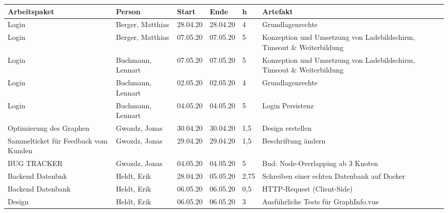 \begin{longtable}{|p{4cm}|p{2cm}|p{1.2cm}|p{1.2cm}|p{0.7cm}|p{3.8cm}|}
  \hline
  Arbeitspaket                                                          & Person                & Start    & Ende     & h     & Artefakt \\
  \hline
  Login                                                                 & Berger, Matthias      & 28.04.20 & 28.04.20 & 4     & Grundlagenrechte \\
  \hline
  Login                                                                 & Berger, Matthias      & 07.05.20 & 07.05.20 & 5     & Konzeption und Umsetzung von Ladebildschirm, Timeout \& Weiterbildung \\
  \hline
  Login                                                                 & Buchmann, Lennart     & 07.05.20 & 07.05.20 & 5     & Konzeption und Umsetzung von Ladebildschirm, Timeout \& Weiterbildung \\
  \hline
  Login                                                                 & Buchmann, Lennart     & 02.05.20 & 02.05.20 & 4     & Grundlagenrechte \\
  \hline
  Login                                                                 & Buchmann, Lennart     & 04.05.20 & 04.05.20 & 5     & Login Persistenz \\
  \hline
  Optimierung des Graphen                                               & Gwozdz, Jonas         & 30.04.20 & 30.04.20 & 1,5   & Design erstellen \\
  \hline
  Sammelticket für Feedback vom Kunden                                  & Gwozdz, Jonas         & 29.04.20 & 29.04.20 & 1,5   & Beschriftung ändern \\
  \hline
  BUG TRACKER                                                           & Gwozdz, Jonas         & 04.05.20 & 04.05.20 & 5     & Bud: Node-Overlapping ab 3 Knoten \\
  \hline
  Backend Datenbnk                                                      & Heldt, Erik           & 28.04.20 & 05.05.20 & 2,75  & Schreiben einer echten Datenbank auf Docker \\
  \hline
  Backend Datenbank                                                     & Heldt, Erik           & 06.05.20 & 06.05.20 & 0,5   & HTTP-Request (Client-Side) \\
  \hline
  Design                                                                & Heldt, Erik           & 06.05.20 & 06.05.20 & 3     & Ausführliche Tests für GraphInfo.vue \\

\end{longtable}
